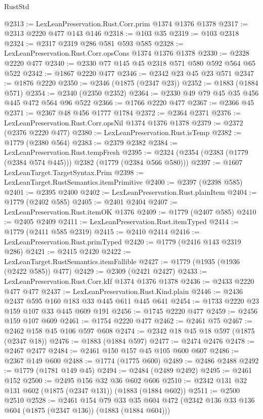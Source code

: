 \begin{lexlean}{RustStd}
\begin{coremodule}
{\begin{coremodule}
{{{{{{{{{{{@2313 := LexLeanPreservation.Rust.Corr.prim @1374 @1376 @1378
@2317 := @2313 @2220 @477 @143 @146
@2318 := @103 @35
@2319 := @103 @2318
@2324 := @2317 @2319 @286 @581 @593 @585
@2328 := LexLeanPreservation.Rust.Corr.opsCons @1374 @1376 @1378
@2330 := @2328 @2220 @477
@2340 := @2330 @77 @145 @45 @2318 @571 @580 @592 @564 @65 @522
@2342 := @1867 @2220 @477
@2346 := @2342 @23 @45 @23 @571
@2347 := @1876 @2220
@2350 := @2346 (@1875 (@2347 @23))
@2352 := @1883 (@1884 @571)
@2354 := @2340 (@2350 @2352)
@2364 := @2330 @49 @79 @45 @35 @456 @445 @472 @564 @96 @522
@2366 := @1766 @2220 @477
@2367 := @2366 @45
@2371 := @2367 @48 @456 @1777 @1784
@2372 := @2364 @2371
@2376 := LexLeanPreservation.Rust.Corr.opsNil @1374 @1376 @1378
@2379 := @2372 (@2376 @2220 @477)
@2380 := LexLeanPreservation.Rust.isTemp
@2382 := @1779 (@2380 @564)
@2383 := @2379 @2382
@2384 := LexLeanPreservation.Rust.tempFresh
@2395 := @2324 (@2354 (@2383 (@1779 (@2384 @574 @445))) @2382 (@1779 (@2384 @566 @580)))
@2397 := @1607 LexLeanTarget.TargetSyntax.Prim
@2398 := LexLeanTarget.RustSemantics.itemPrimitive
@2400 := @2397 (@2398 @585)
@2401 := @2395 @2400
@2402 := LexLeanPreservation.Rust.plainItem
@2404 := @1779 (@2402 @585)
@2405 := @2401 @2404
@2407 := LexLeanPreservation.Rust.itemOK @1376
@2409 := @1779 (@2407 @585)
@2410 := @2405 @2409
@2411 := LexLeanPreservation.Rust.itemTyped
@2414 := @1779 (@2411 @585 @2319)
@2415 := @2410 @2414
@2416 := LexLeanPreservation.Rust.primTyped
@2420 := @1779 (@2416 @143 @2319 @286)
@2421 := @2415 @2420
@2422 := LexLeanTarget.RustSemantics.itemFallible
@2427 := @1779 (@1935 (@1936 (@2422 @585)) @477)
@2429 := @2309 (@2421 @2427)
@2433 := LexLeanPreservation.Rust.Corr.kIf @1374 @1376 @1378
@2436 := @2433 @2220 @477 @477
@2437 := LexLeanPreservation.Rust.Kind.plain
@2446 := @2436 @2437 @595 @160 @183 @33 @445 @611 @445 @641
@2454 := @1733 @2220 @23 @159 @107 @33 @445 @609 @191
@2456 := @1745 @2220 @477
@2459 := @2456 @159 @107 @609
@2461 := @1754 @2220 @477
@2462 := @2461 @75
@2467 := @2462 @158 @45 @106 @597 @608
@2474 := @2342 @18 @45 @18 @597 (@1875 (@2347 @18))
@2476 := @1883 (@1884 @597)
@2477 := @2474 @2476
@2478 := @2467 @2477
@2484 := @2461 @150 @157 @45 @105 @600 @607
@2486 := @2367 @149 @600
@2488 := @1774 (@1775 @600)
@2489 := @2486 @2488
@2492 := @1779 (@1781 @149 @45)
@2494 := @2484 (@2489 @2492)
@2495 := @2461 @152
@2500 := @2495 @156 @32 @36 @602 @606
@2510 := @2342 @131 @32 @131 @602 (@1875 (@2347 @131)) (@1883 (@1884 @602))
@2511 := @2500 @2510
@2528 := @2461
    @154
    @79
    @33
    @35
    @604
    @472
    (@2342 @136 @33 @136 @604 (@1875 (@2347 @136)) (@1883 (@1884 @604)))
}}}}}}}}}}}
\end{coremodule}}
\end{coremodule}
\end{lexlean}
